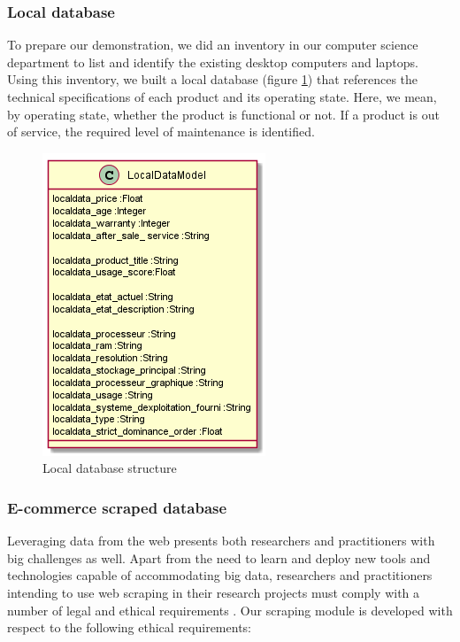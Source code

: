 \documentclass[preprint,3p,onecolumn]{elsarticle}
\begin{document}
\subsubsection{Local database}
\par To prepare our demonstration, we did an inventory in our computer science department to list and identify the existing desktop computers and laptops. Using this inventory, we built a local database (figure \ref{localdatabase}) that references the technical specifications of each product and its operating state. Here, we mean, by operating state, whether the product is functional or not. If a product is out of service, the required level of maintenance is identified.
\begin{figure}[H]
\centering
\includegraphics[scale=.7]{localdatabase}
\caption{Local database structure}
\label{localdatabase}
\end{figure}

\subsubsection{E-commerce scraped database}

\par Leveraging data from the web presents both researchers and practitioners with big challenges as well. Apart from the need to learn and deploy new tools and technologies capable of accommodating big data, researchers and practitioners intending to use web scraping in their research projects must comply with a number of legal and ethical requirements \citep{krotov2018legality}. Our scraping module is developed with respect to the following ethical requirements:
\end{document}
